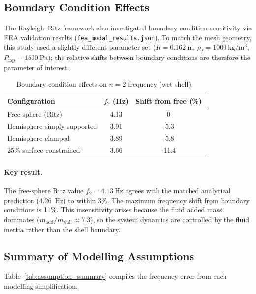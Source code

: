 \documentclass[12pt]{article}
\begin{document}
\subsection{Boundary Condition Effects}
\label{sec:bc}

The Rayleigh--Ritz framework also investigated boundary condition sensitivity
via FEA validation results (\texttt{fea\_modal\_results.json}).  To match the
mesh geometry, this study used a slightly different parameter set
($R = \SI{0.162}{\metre}$, $\rho_f = \SI{1000}{\kilo\gram\per\metre\cubed}$,
$P_{\mathrm{iap}} = \SI{1500}{\pascal}$); the relative shifts between boundary
conditions are therefore the parameter of interest.

\begin{table}[htbp]
\centering
\caption{Boundary condition effects on $n=2$ frequency (wet shell).}
\label{tab:bc}
\begin{tabular}{@{}lSS@{}}
\toprule
{Configuration} & {$f_{2}$ (\si{\hertz})} & {Shift from free (\%)} \\
\midrule
Free sphere (Ritz)          & 4.13 & 0     \\
Hemisphere simply-supported & 3.91 & -5.3  \\
Hemisphere clamped          & 3.89 & -5.8  \\
25\% surface constrained    & 3.66 & -11.4 \\
\bottomrule
\end{tabular}
\end{table}

\paragraph{Key result.}
The free-sphere Ritz value $f_{2} = \SI{4.13}{\hertz}$ agrees with the matched
analytical prediction (\SI{4.26}{\hertz}) to within 3\%.  The maximum
frequency shift from boundary conditions is 11\%.  This
insensitivity arises because the fluid added mass dominates
($m_{\mathrm{add}}/m_{\mathrm{wall}} \approx 7.3$), so the system dynamics
are controlled by the fluid inertia rather than the shell boundary.


\subsection{Summary of Modelling Assumptions}
\label{sec:sensitivity_summary}

Table~\ref{tab:assumption_summary} compiles the frequency error from each
modelling simplification.
\end{document}
